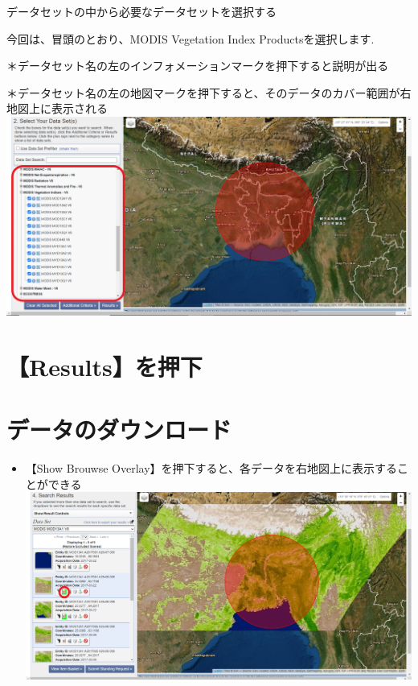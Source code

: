 \documentclass[
]{book}
\providecommand{\tightlist}{%
  \setlength{\itemsep}{0pt}\setlength{\parskip}{0pt}}
\begin{document}
データセットの中から必要なデータセットを選択する

今回は、冒頭のとおり、MODIS Vegetation Index Productsを選択します.

＊データセット名の左のインフォメーションマークを押下すると説明が出る

＊データセット名の左の地図マークを押下すると、そのデータのカバー範囲が右地図上に表示される\\
\includegraphics{images/datasets.png}

\hypertarget{resultsux3092ux62bcux4e0b}{%
\section{【Results】を押下}\label{resultsux3092ux62bcux4e0b}}

\hypertarget{ux30c7ux30fcux30bfux306eux30c0ux30a6ux30f3ux30edux30fcux30c9}{%
\section{データのダウンロード}\label{ux30c7ux30fcux30bfux306eux30c0ux30a6ux30f3ux30edux30fcux30c9}}

\begin{itemize}
\tightlist
\item
  【Show Brouwse Overlay】を押下すると、各データを右地図上に表示することができる
  \includegraphics{images/overray.png}
\end{itemize}
\end{document}
